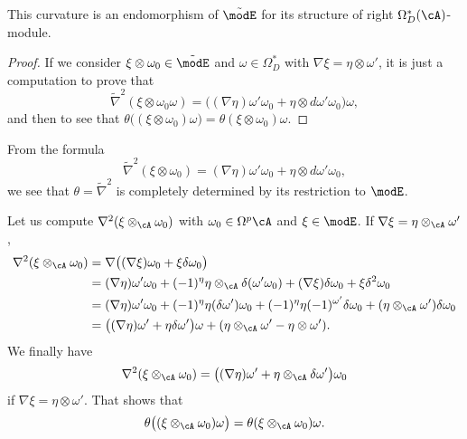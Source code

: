 \begin{proposition}
	This curvature is an endomorphism of $\tilde\modE$ for its structure of right $\Omega^*_D(\cA)$-module.
\end{proposition}

\begin{proof}
	If we consider $\xi\otimes\omega_0\in\tilde\modE$ and $\omega\in\Omega^*_D$ with $\nabla\xi=\eta\otimes\omega'$, it is just a computation to prove that
	\[
		\tilde\nabla^2(\xi\otimes\omega_0\omega)=\big((\nabla\eta)\omega'\omega_0+\eta\otimes d\omega'\omega_0\big)\omega,
	\]
	and then to see that $\theta\big( (\xi\otimes\omega_0)\omega \big)=\theta(\xi\otimes\omega_0)\omega$.
\end{proof}

From the formula
\begin{equation}
	\tilde\nabla^2(\xi\otimes\omega_0)=(\nabla\eta)\omega'\omega_0+\eta\otimes d\omega'\omega_0,
\end{equation}
we see that $\theta=\tilde\nabla^2$ is completely determined by its restriction to $\modE$.

Let us compute $\nabla^2(\xi\otimes_{\cA}\omega_0)$ with $\omega_0\in\Omega^p\cA$ and $\xi\in\modE$. If $\nabla\xi=\eta\otimes_{\cA}\omega'$,
\begin{align*}
	\nabla^2(\xi\otimes_{\cA}\omega_0) & =\nabla\big( (\nabla\xi)\omega_0+\xi\delta\omega_0 \big)                                                                                                  \\
	                                   & = (\nabla\eta)\omega'\omega_0+(-1)^{\eta}\eta\otimes_{\cA}\delta(\omega'\omega_0)+(\nabla\xi)\delta\omega_0+\xi\delta^{2}\omega_0                         \\
	                                   & = (\nabla\eta)\omega'\omega_0+(-1)^{\eta}\eta(\delta\omega')\omega_0+(-1)^{\eta}\eta(-1)^{\omega'}\delta\omega_0+(\eta\otimes_{\cA}\omega')\delta\omega_0 \\
	                                   & = \big( (\nabla\eta)\omega'+\eta\delta\omega' \big)\omega+(\eta\otimes_{\cA}\omega'-\eta\otimes\omega').
\end{align*}
We finally have
\begin{equation}
	\nabla^2(\xi\otimes_{\cA}\omega_0)=\big( (\nabla\eta)\omega'+\eta\otimes_{\cA}\delta\omega' \big)\omega_0
\end{equation}
if $\nabla\xi=\eta\otimes\omega'$. That shows that
\begin{equation}	\label{EqThetaCourbomega}
	\theta\big( (\xi\otimes_{\cA}\omega_0)\omega \big)=\theta(\xi\otimes_{\cA}\omega_0)\omega.
\end{equation}

